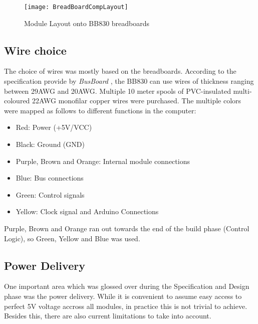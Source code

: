 \begin{figure}[h]
  \centering
  \texttt{[image: BreadBoardCompLayout]}
  \caption{Module Layout onto BB830 breadboards}
  \label{module_layout}
\end{figure}
\pagebreak

\subsection{Wire choice}
The choice of wires was mostly based on the breadboards. According to the specification provide
by \emph{BusBoard} \cite{multicomp2020breadboards}, the BB830 can use wires of thickness ranging
between 29AWG and 20AWG. Multiple 10 meter spools of PVC-insulated multi-coloured 22AWG monofilar
copper wires were purchased. The multiple colors were mapped as follows to different functions
in the computer:
\begin{itemize}
  \item Red: Power (+5V/VCC)
  \item Black: Ground (GND)
  \item Purple, Brown and Orange: Internal module connections
  \item Blue: Bus connections
  \item Green: Control signals
  \item Yellow: Clock signal and Arduino Connections
\end{itemize}
Purple, Brown and Orange ran out towards the end of the build phase (Control Logic), so Green,
Yellow and Blue was used.

\subsection{Power Delivery}
One important area which was glossed over during the Specification and Design phase was the power
delivery. While it is convenient to assume easy access to perfect 5V voltage accross all modules,
in practice this is not trivial to achieve. Besides this, there are also current limitations to
take into account.

